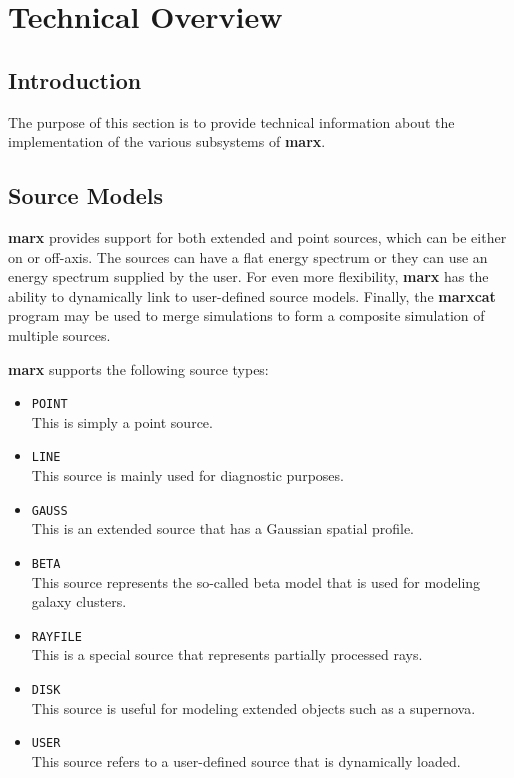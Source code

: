 \documentclass{article}
\newcommand{\marx}{{\bf marx}}
\newcommand{\marxcat}{{\bf marxcat}}
\begin{document}
\section{Technical Overview}
\subsection{Introduction}
 The purpose of this section is to provide technical information about
 the implementation of the various subsystems of \marx{}.

\subsection{Source Models} %
\marx{} provides support for both extended and point sources, which can
be either on or off-axis.  The sources can have a flat energy spectrum
or they can use an energy spectrum supplied by the user.  For even
more flexibility, \marx{} has the ability to dynamically link to
user-defined source models.  Finally, the \marxcat{} program may be used
to merge simulations to form a composite simulation of multiple sources.

\marx{} supports the following source types: 
\begin{itemize}
  \item {\tt POINT}\\
     This is simply a point source.

  \item {\tt LINE}\\
     This source is mainly used for diagnostic purposes.

  \item {\tt GAUSS}\\
     This is an extended source that has a Gaussian spatial profile.
     
  \item {\tt BETA}\\
     This source represents the so-called beta model that is used for
     modeling galaxy clusters.

  \item {\tt RAYFILE}\\
     This is a special source that represents partially processed rays.

  \item {\tt DISK}\\
     This source is useful for modeling extended objects such as
     a supernova.

  \item {\tt USER}\\
     This source refers to a user-defined source that is dynamically
     loaded.
\end{itemize}
\end{document}
